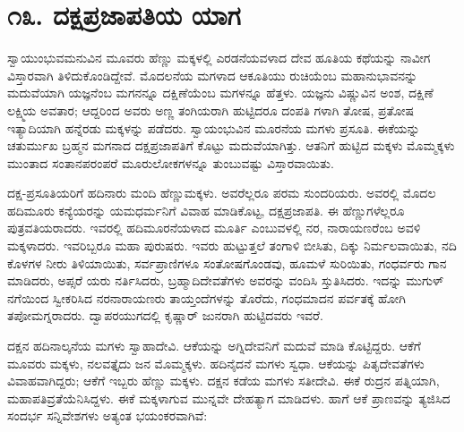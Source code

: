 
\chapter{೧೩. ದಕ್ಷಪ್ರಜಾಪತಿಯ ಯಾಗ}

ಸ್ವಾಯುಂಭುವಮನುವಿನ ಮೂವರು ಹೆಣ್ಣು ಮಕ್ಕಳಲ್ಲಿ ಎರಡನೆಯವಳಾದ ದೇವ ಹೂತಿಯ ಕಥೆಯನ್ನು ನಾವೀಗ ವಿಸ್ತಾರವಾಗಿ ತಿಳಿದುಕೊಂಡಿದ್ದೇವೆ. ಮೊದಲನೆಯ ಮಗಳಾದ ಆಕೂತಿಯು ರುಚಿಯೆಂಬ ಮಹಾನುಭಾವನನ್ನು ಮದುವೆಯಾಗಿ ಯಜ್ಞನೆಂಬ ಮಗನನ್ನೂ ದಕ್ಷಿಣೆಯೆಂಬ ಮಗಳನ್ನೂ ಹೆತ್ತಳು. ಯಜ್ಞನು ವಿಷ್ಣುವಿನ ಅಂಶ, ದಕ್ಷಿಣೆ ಲಕ್ಷ್ಮಿಯ ಅವತಾರ; ಆದ್ದರಿಂದ ಅವರು ಅಣ್ಣ ತಂಗಿಯರಾಗಿ ಹುಟ್ಟಿದರೂ ದಂಪತಿ ಗಳಾಗಿ ತೋಷ, ಪ್ರತೋಷ ಇತ್ಯಾದಿಯಾಗಿ ಹನ್ನೆರಡು ಮಕ್ಕಳನ್ನು ಪಡೆದರು. ಸ್ವಾಯಂಭುವಿನ ಮೂರನೆಯ ಮಗಳು ಪ್ರಸೂತಿ. ಈಕೆಯನ್ನು ಚತುರ್ಮುಖ ಬ್ರಹ್ಮನ ಮಗನಾದ ದಕ್ಷಪ್ರಜಾಪತಿಗೆ ಕೊಟ್ಟು ಮದುವೆಯಾಗಿತ್ತು. ಆತನಿಗೆ ಹುಟ್ಟಿದ ಮಕ್ಕಳು ಮೊಮ್ಮಕ್ಕಳು ಮುಂತಾದ ಸಂತಾನಪರಂಪರೆ ಮೂರುಲೋಕಗಳನ್ನೂ ತುಂಬುವಷ್ಟು ವಿಸ್ತಾರವಾಯಿತು.

ದಕ್ಷ-ಪ್ರಸೂತಿಯರಿಗೆ ಹದಿನಾರು ಮಂದಿ ಹೆಣ್ಣುಮಕ್ಕಳು. ಅವರೆಲ್ಲರೂ ಪರಮ ಸುಂದರಿಯರು. ಅವರಲ್ಲಿ ಮೊದಲ ಹದಿಮೂರು ಕನ್ಯೆಯರನ್ನು ಯಮಧರ್ಮನಿಗೆ ವಿವಾಹ ಮಾಡಿಕೊಟ್ಟ, ದಕ್ಷಪ್ರಜಾಪತಿ. ಈ ಹೆಣ್ಣುಗಳೆಲ್ಲರೂ ಪುತ್ರವತಿಯರಾದರು. ಇವರಲ್ಲಿ ಹದಿಮೂರನೆಯಳಾದ ಮೂರ್ತಿ ಎಂಬುವಳಲ್ಲಿ ನರ, ನಾರಾಯಣರೆಂಬ ಅವಳಿ ಮಕ್ಕಳಾದರು. ಇವರಿಬ್ಬರೂ ಮಹಾ ಪುರುಷರು. ಇವರು ಹುಟ್ಟುತ್ತಲೆ ತಂಗಾಳಿ ಬೀಸಿತು, ದಿಕ್ಕು ನಿರ್ಮಲವಾಯಿತು, ನದಿ ಕೊಳಗಳ ನೀರು ತಿಳಿಯಾಯಿತು, ಸರ್ವಪ್ರಾಣಿಗಳೂ ಸಂತೋಷಗೊಂಡವು, ಹೂಮಳೆ ಸುರಿಯಿತು, ಗಂಧರ್ವರು ಗಾನ ಮಾಡಿದರು, ಅಪ್ಸರೆ ಯರು ನರ್ತಿಸಿದರು, ಬ್ರಹ್ಮಾದಿದೇವತೆಗಳು ಅವರನ್ನು ವಂದಿಸಿ ಸ್ತುತಿಸಿದರು. ಇದನ್ನು ಮುಗುಳ್​ನಗೆಯಿಂದ ಸ್ವೀಕರಿಸಿದ ನರನಾರಾಯಣರು ತಾಯ್ತಂದೆಗಳನ್ನು ತೊರೆದು, ಗಂಧಮಾದನ ಪರ್ವತಕ್ಕೆ ಹೋಗಿ ತಪೋಮಗ್ನರಾದರು. ದ್ವಾಪರಯುಗದಲ್ಲಿ ಕೃಷ್ಣಾರ್ ಜುನರಾಗಿ ಹುಟ್ಟಿದವರು ಇವರೆ.

ದಕ್ಷನ ಹದಿನಾಲ್ಕನೆಯ ಮಗಳು ಸ್ವಾಹಾದೇವಿ. ಆಕೆಯನ್ನು ಅಗ್ನಿದೇವನಿಗೆ ಮದುವೆ ಮಾಡಿ ಕೊಟ್ಟಿದ್ದರು. ಆಕೆಗೆ ಮೂವರು ಮಕ್ಕಳು, ನಲವತ್ತೈದು ಜನ ಮೊಮ್ಮಕ್ಕಳು. ಹದಿನೈದನೆ ಮಗಳು ಸ್ವಧಾ. ಆಕೆಯನ್ನು ಪಿತೃದೇವತೆಗಳು ವಿವಾಹವಾಗಿದ್ದರು; ಆಕೆಗೆ ಇಬ್ಬರು ಹೆಣ್ಣು ಮಕ್ಕಳು. ದಕ್ಷನ ಕಡೆಯ ಮಗಳು ಸತೀದೇವಿ. ಈಕೆ ರುದ್ರನ ಪತ್ನಿಯಾಗಿ, ಮಹಾಪತಿವ್ರತೆಯೆನಿಸಿದ್ದಳು. ಈಕೆ ಮಕ್ಕಳಾಗುವ ಮುನ್ನವೇ ದೇಹತ್ಯಾಗ ಮಾಡಿದಳು. ಹಾಗೆ ಆಕೆ ಪ್ರಾಣವನ್ನು ತ್ಯಜಿಸಿದ ಸಂದರ್ಭ ಸನ್ನಿವೇಶಗಳು ಅತ್ಯಂತ ಭಯಂಕರವಾಗಿವೆ:

